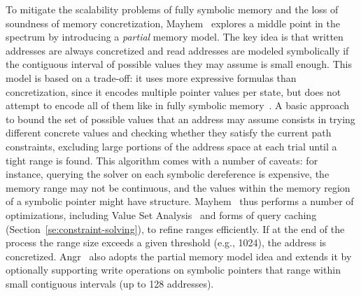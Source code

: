 To mitigate the scalability problems of fully symbolic memory and the loss of soundness of memory concretization,
{\sc Mayhem}~\cite{MAYHEM-SP12} explores a middle point in the spectrum by introducing a {\em partial} memory model. The key idea is that written addresses are always concretized and read addresses are modeled symbolically if the contiguous interval of possible values they may assume is small enough. This model is based on a trade-off: it uses more expressive formulas than concretization, since it encodes multiple pointer values per state, but does not attempt to encode all of them like in fully symbolic memory~\cite{MAYHEM-THESIS}. A basic approach to bound the set of possible values that an address may assume consists in trying different concrete values and checking whether they satisfy the current path constraints, excluding large portions of the address space at each trial until a tight range is found.  
This algorithm comes with a number of caveats: for instance, querying the solver on each symbolic dereference is expensive, the memory range may not be continuous, and the values within the memory region of a symbolic pointer might have structure. {\sc Mayhem}~\cite{MAYHEM-SP12} thus performs a number of optimizations, including Value Set Analysis~\cite{VSA-CC04} and forms of query caching (Section~\ref{se:constraint-solving}), to refine ranges efficiently. If at the end of the process the range size exceeds a given threshold (e.g., 1024), the address is concretized. {\sc Angr}~\cite{ANGR-SSP16} also adopts the partial memory model idea and extends it by optionally supporting write operations on symbolic pointers that range within small contiguous intervals (up to 128 addresses). %

